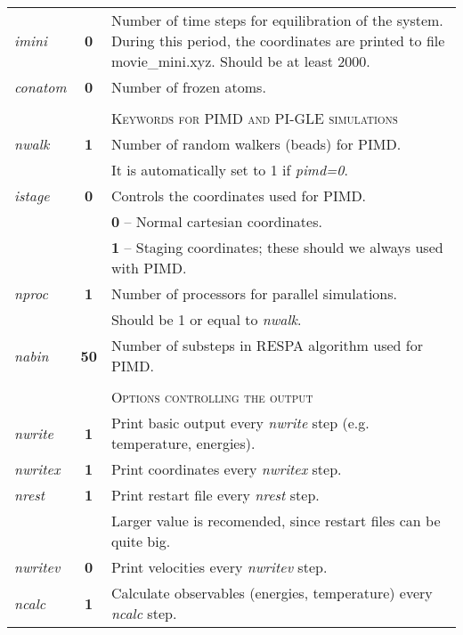 \documentclass[12pt,a4paper]{article}
\begin{document}
\begin{tabular}{lcl}
\textit{imini} & \textbf{0} &  Number of time steps for equilibration of the system. 
During this period, the coordinates are printed to file movie\_mini.xyz. Should be at least 2000. \\

\textit{conatom} & \textbf{0} & Number of frozen atoms. \\ 
& & \\
& & \textsc{Keywords for PIMD and PI-GLE simulations} \\
\textit{nwalk} & \textbf{1} & Number of random walkers (beads) for PIMD. \\
 & & It is automatically set to 1 if \textit{pimd=0}. \\
 
\textit{istage}  & \textbf{0} & Controls the coordinates used for PIMD.\\
 & & \textbf{0} -- Normal cartesian coordinates.  \\
 & & \textbf{1} -- Staging coordinates; these should we always used with PIMD. \\
\textit{nproc} & \textbf{1} & Number of processors for parallel simulations. \\
& & Should be 1 or equal to \textit{nwalk}. 	 \\
\colorbox{black!20}{\textit{nabin}} & \textbf{50} & Number of substeps in RESPA algorithm used for PIMD. \\
 
& & \\
& & \textsc{Options controlling the output} \\
\textit{nwrite} & \textbf{1}  & Print basic output every \textit{nwrite} step (e.g. temperature, energies).  \\
\textit{nwritex}& \textbf{1}  & Print coordinates every  \textit{nwritex} step. \\
\textit{nrest} & \textbf{1}   & Print restart file every \textit{nrest} step.   \\
& &  Larger value is recomended, since restart files can be quite big. \\
\textit{nwritev} & \textbf{0} & Print velocities every \textit{nwritev} step.   \\
\colorbox{black!20}{\textit{ncalc}} & \textbf{1}   & Calculate observables (energies, temperature) every \textit{ncalc} step. 	\\

\end{tabular}
\newpage
\end{document}
